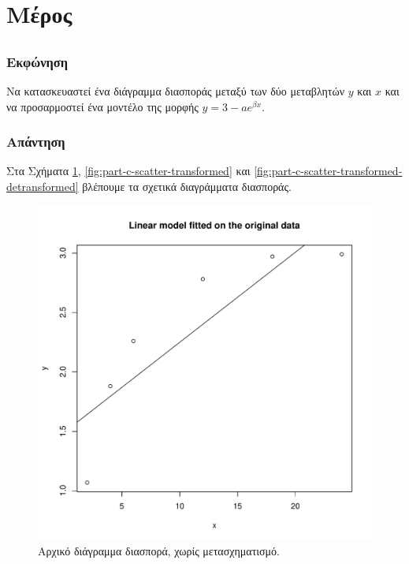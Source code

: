 \documentclass{article}
\begin{document}
\section{Μέρος}

\subsection{}
\subsubsection*{Εκφώνηση}
Να κατασκευαστεί ένα διάγραμμα διασποράς μεταξύ των δύο μεταβλητών \(y\) και \(x\) και να προσαρμοστεί ένα μοντέλο της μορφής \(y = 3 - a e^{\beta x}\).
\subsubsection*{Απάντηση}
Στα Σχήματα \ref{fig:part-c-scatter-original}, \ref{fig:part-c-scatter-transformed} και \ref{fig:part-c-scatter-transformed-detransformed} βλέπουμε τα σχετικά διαγράμματα διασποράς.
\begin{figure}[h]
    \centering
    \includegraphics[width=1.0\textwidth]{part-c-scatter-original.pdf}
    \caption{Αρχικό διάγραμμα διασπορά, χωρίς μετασχηματισμό.}
    \label{fig:part-c-scatter-original}
\end{figure}
\end{document}

